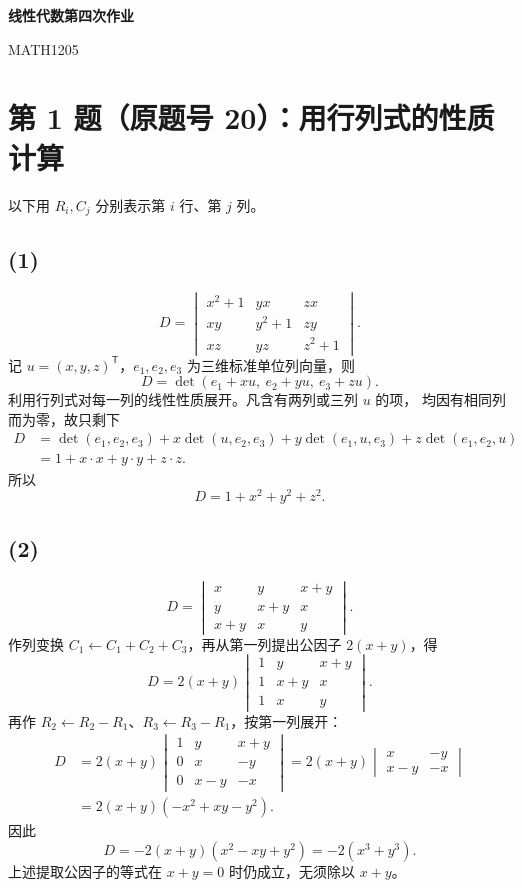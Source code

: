 \documentclass[11pt,a4paper,fontset=fandol]{ctexart}
\newcommand{\T}{^{\mathsf T}}
\newcommand{\ans}[1]{\boxed{#1}}
\begin{document}
\begin{center}
  {\LARGE\bfseries 线性代数第四次作业}\par
  \vspace{0.25em}
  {\small MATH1205}
\end{center}
\vspace{-0.5em}

\section*{第 1 题（原题号 20）：用行列式的性质计算}
以下用 $R_i,C_j$ 分别表示第 $i$ 行、第 $j$ 列。

\subsection*{(1)}
\[
D=\begin{vmatrix}
x^2+1&yx&zx\\
xy&y^2+1&zy\\
xz&yz&z^2+1
\end{vmatrix}.
\]
记 $u=(x,y,z)\T$，$e_1,e_2,e_3$ 为三维标准单位列向量，则
\[
D=\det(e_1+xu,\ e_2+yu,\ e_3+zu).
\]
利用行列式对每一列的线性性质展开。凡含有两列或三列 $u$ 的项，
均因有相同列而为零，故只剩下
\begin{align*}
D&=\det(e_1,e_2,e_3)+x\det(u,e_2,e_3)
  +y\det(e_1,u,e_3)+z\det(e_1,e_2,u)\\
 &=1+x\cdot x+y\cdot y+z\cdot z.
\end{align*}
所以
\[
\ans{D=1+x^2+y^2+z^2}.
\]

\subsection*{(2)}
\[
D=\begin{vmatrix}
x&y&x+y\\
y&x+y&x\\
x+y&x&y
\end{vmatrix}.
\]
作列变换 $C_1\leftarrow C_1+C_2+C_3$，再从第一列提出公因子 $2(x+y)$，得
\[
D=2(x+y)\begin{vmatrix}
1&y&x+y\\
1&x+y&x\\
1&x&y
\end{vmatrix}.
\]
再作 $R_2\leftarrow R_2-R_1$、$R_3\leftarrow R_3-R_1$，按第一列展开：
\begin{align*}
D&=2(x+y)\begin{vmatrix}
1&y&x+y\\
0&x&-y\\
0&x-y&-x
\end{vmatrix}
=2(x+y)\begin{vmatrix}x&-y\\x-y&-x\end{vmatrix}\\
&=2(x+y)(-x^2+xy-y^2).
\end{align*}
因此
\[
\ans{D=-2(x+y)(x^2-xy+y^2)=-2(x^3+y^3)}.
\]
上述提取公因子的等式在 $x+y=0$ 时仍成立，无须除以 $x+y$。
\end{document}
